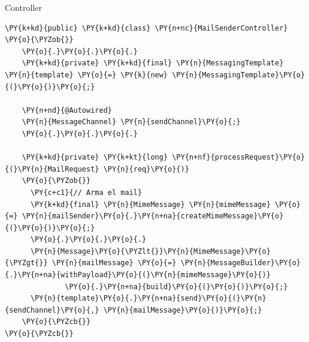 \documentclass{beamer}
\begin{document}
\begin{frame}[fragile]{Controller}
\begin{Verbatim}[fontsize=\tiny,commandchars=\\\{\}]
\PY{k+kd}{public} \PY{k+kd}{class} \PY{n+nc}{MailSenderController}
\PY{o}{\PYZob{}}
    \PY{o}{.}\PY{o}{.}\PY{o}{.}
    \PY{k+kd}{private} \PY{k+kd}{final} \PY{n}{MessagingTemplate} \PY{n}{template} \PY{o}{=} \PY{k}{new} \PY{n}{MessagingTemplate}\PY{o}{(}\PY{o}{)}\PY{o}{;}

    \PY{n+nd}{@Autowired}
    \PY{n}{MessageChannel} \PY{n}{sendChannel}\PY{o}{;}
    \PY{o}{.}\PY{o}{.}\PY{o}{.}
    
    \PY{k+kd}{private} \PY{k+kt}{long} \PY{n+nf}{processRequest}\PY{o}{(}\PY{n}{MailRequest} \PY{n}{req}\PY{o}{)}
    \PY{o}{\PYZob{}}
      \PY{c+c1}{// Arma el mail}
      \PY{k+kd}{final} \PY{n}{MimeMessage} \PY{n}{mimeMessage} \PY{o}{=} \PY{n}{mailSender}\PY{o}{.}\PY{n+na}{createMimeMessage}\PY{o}{(}\PY{o}{)}\PY{o}{;}
      \PY{o}{.}\PY{o}{.}\PY{o}{.}
      \PY{n}{Message}\PY{o}{\PYZlt{}}\PY{n}{MimeMessage}\PY{o}{\PYZgt{}} \PY{n}{mailMessage} \PY{o}{=} \PY{n}{MessageBuilder}\PY{o}{.}\PY{n+na}{withPayload}\PY{o}{(}\PY{n}{mimeMessage}\PY{o}{)}
              \PY{o}{.}\PY{n+na}{build}\PY{o}{(}\PY{o}{)}\PY{o}{;}
      \PY{n}{template}\PY{o}{.}\PY{n+na}{send}\PY{o}{(}\PY{n}{sendChannel}\PY{o}{,} \PY{n}{mailMessage}\PY{o}{)}\PY{o}{;}      
    \PY{o}{\PYZcb{}}
\PY{o}{\PYZcb{}}
\end{Verbatim}
\end{frame}
\end{document}
